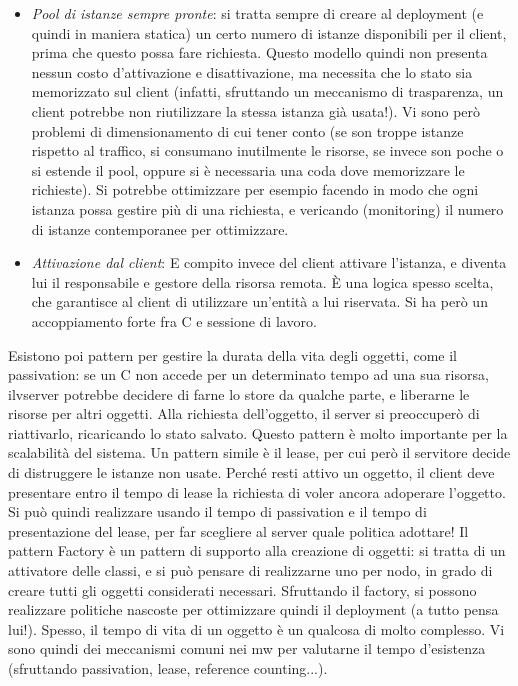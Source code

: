 \begin{itemize}
 \item \textit{Pool di istanze sempre pronte}: si tratta sempre di creare al deployment (e quindi in maniera statica)
 un certo numero di istanze disponibili per il client, prima che questo possa fare richiesta. Questo modello quindi
 non presenta nessun costo d'attivazione e disattivazione, ma necessita che lo stato sia memorizzato sul client
 (infatti, sfruttando un meccanismo di trasparenza, un client potrebbe non riutilizzare la stessa istanza già usata!).
 Vi sono però problemi di dimensionamento di cui tener conto (se son troppe istanze rispetto al traffico, si consumano
 inutilmente le risorse, se invece son poche o si estende il pool, oppure si è necessaria una coda dove memorizzare le
 richieste). Si potrebbe ottimizzare per esempio facendo in modo che ogni istanza possa gestire più di una richiesta,
 e vericando (monitoring) il numero di istanze contemporanee per ottimizzare.
 \item \textit{Attivazione dal client}: E compito invece del client attivare l'istanza, e diventa lui il responsabile
 e gestore della risorsa remota. È una logica spesso scelta, che garantisce al client di utilizzare un'entità a lui
 riservata. Si ha però un accoppiamento forte fra C e sessione di lavoro.
\end{itemize}
Esistono poi pattern per gestire la durata della vita degli oggetti, come il passivation: se un C non accede per un
determinato tempo ad una sua risorsa, ilvserver potrebbe decidere di farne lo store da qualche parte, e liberarne le
risorse per altri oggetti. Alla richiesta dell'oggetto, il server si preoccuperò di riattivarlo, ricaricando lo stato
salvato. Questo pattern è molto importante per la scalabilità del sistema.
Un pattern simile è il lease, per cui però il servitore decide di distruggere le istanze non usate. Perché resti
attivo un oggetto, il client deve presentare entro il tempo di lease la richiesta di voler ancora adoperare l'oggetto.
Si può quindi realizzare usando il tempo di passivation e il tempo di presentazione del lease, per far scegliere al
server quale politica adottare!
Il pattern Factory è un pattern di supporto alla creazione di oggetti: si tratta di un attivatore delle classi, e si
può pensare di realizzarne uno per nodo, in grado di creare tutti gli oggetti considerati necessari. Sfruttando il
factory, si possono realizzare politiche nascoste per ottimizzare quindi il deployment (a tutto pensa lui!).
Spesso, il tempo di vita di un oggetto è un qualcosa di molto complesso. Vi sono quindi dei meccanismi comuni nei mw
per valutarne il tempo d'esistenza (sfruttando passivation, lease, reference counting...).
